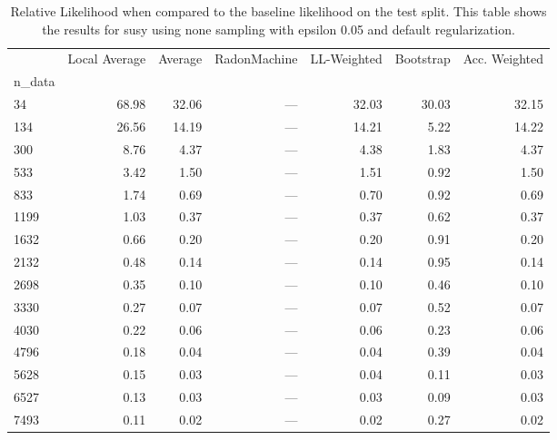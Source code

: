 \begin{table}
\centering
\caption{Relative Likelihood when compared to the baseline likelihood on the test split. This table shows the results for  susy using  none sampling with epsilon  0.05 and  default regularization.}
\label{tab:1}
\begin{tabular}{lrrrrrr}
\toprule
{} &  Local Average &  Average &  RadonMachine &  LL-Weighted &  Bootstrap &  Acc. Weighted \\
n\_data &                &          &               &              &            &                \\
\midrule
34     &          68.98 &    32.06 &           --- &        32.03 &      30.03 &          32.15 \\
134    &          26.56 &    14.19 &           --- &        14.21 &       5.22 &          14.22 \\
300    &           8.76 &     4.37 &           --- &         4.38 &       1.83 &           4.37 \\
533    &           3.42 &     1.50 &           --- &         1.51 &       0.92 &           1.50 \\
833    &           1.74 &     0.69 &           --- &         0.70 &       0.92 &           0.69 \\
1199   &           1.03 &     0.37 &           --- &         0.37 &       0.62 &           0.37 \\
1632   &           0.66 &     0.20 &           --- &         0.20 &       0.91 &           0.20 \\
2132   &           0.48 &     0.14 &           --- &         0.14 &       0.95 &           0.14 \\
2698   &           0.35 &     0.10 &           --- &         0.10 &       0.46 &           0.10 \\
3330   &           0.27 &     0.07 &           --- &         0.07 &       0.52 &           0.07 \\
4030   &           0.22 &     0.06 &           --- &         0.06 &       0.23 &           0.06 \\
4796   &           0.18 &     0.04 &           --- &         0.04 &       0.39 &           0.04 \\
5628   &           0.15 &     0.03 &           --- &         0.04 &       0.11 &           0.03 \\
6527   &           0.13 &     0.03 &           --- &         0.03 &       0.09 &           0.03 \\
7493   &           0.11 &     0.02 &           --- &         0.02 &       0.27 &           0.02 \\
\bottomrule
\end{tabular}
\end{table}
